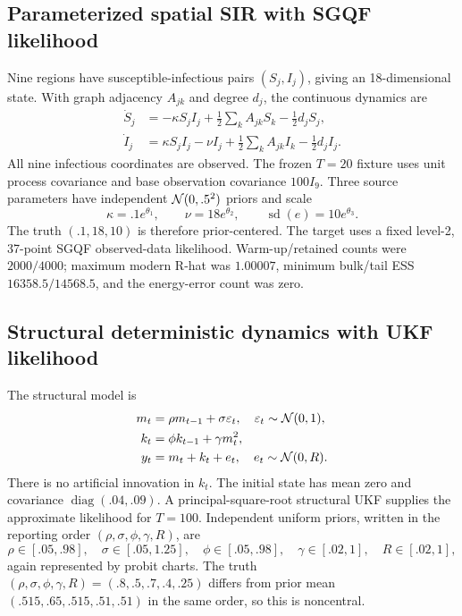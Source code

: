 \subsection{Parameterized spatial SIR with SGQF likelihood}

Nine regions have susceptible-infectious pairs $(S_j,I_j)$, giving an
18-dimensional state.  With graph adjacency $A_{jk}$ and degree $d_j$, the
continuous dynamics are
\begin{align}
 \dot S_j&=-\kappa S_jI_j+\tfrac12\sum_kA_{jk}S_k-\tfrac12d_jS_j,\\
 \dot I_j&=\kappa S_jI_j-\nu I_j+\tfrac12\sum_kA_{jk}I_k-\tfrac12d_jI_j.
\end{align}
All nine infectious coordinates are observed.  The frozen $T=20$ fixture uses
unit process covariance and base observation covariance $100I_9$.  Three
source parameters have independent $\mathcal{N}(0,.5^2)$ priors and scale
\begin{equation}
 \kappa=.1e^{\theta_1},\qquad \nu=18e^{\theta_2},\qquad
 \operatorname{sd}(e)=10e^{\theta_3}.
\end{equation}
The truth $(.1,18,10)$ is therefore prior-centered.  The target uses a fixed
level-2, 37-point SGQF observed-data likelihood.  Warm-up/retained counts were
$2000/4000$; maximum modern R-hat was $1.00007$, minimum bulk/tail ESS
$16358.5/14568.5$, and the energy-error count was zero.

\subsection{Structural deterministic dynamics with UKF likelihood}

The structural model is
\begin{align}
 m_t&=\rho m_{t-1}+\sigma\varepsilon_t,\quad\varepsilon_t\sim\mathcal{N}(0,1),\\
 k_t&=\phi k_{t-1}+\gamma m_t^2,\\
 y_t&=m_t+k_t+e_t,\quad e_t\sim\mathcal{N}(0,R).
 \label{eq:bf-neutra-structural-model}
\end{align}
There is no artificial innovation in $k_t$.  The initial state has mean zero
and covariance $\operatorname{diag}(.04,.09)$.  A principal-square-root
structural UKF supplies the approximate likelihood for $T=100$.  Independent
uniform priors, written in the reporting order
$(\rho,\sigma,\phi,\gamma,R)$, are
\begin{equation}
 \rho\in[.05,.98],\quad \sigma\in[.05,1.25],\quad
 \phi\in[.05,.98],\quad
 \gamma\in[.02,1],\quad R\in[.02,1],
\end{equation}
again represented by probit charts.  The truth
$(\rho,\sigma,\phi,\gamma,R)=(.8,.5,.7,.4,.25)$ differs from prior mean
$(.515,.65,.515,.51,.51)$ in the same order, so this is noncentral.

